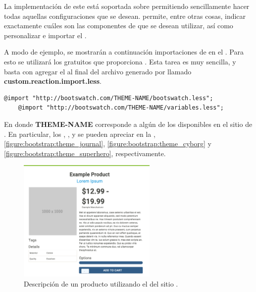 La implementación de este \packagesAS está soportada sobre \bootstrapPackage permitiendo sencillamente hacer todas aquellas configuraciones que se desean. \bootstrapPackage permite, entre otras cosas, indicar exactamente cuáles son las componentes de \bootstrapNAME que se desean utilizar, así como personalizar e importar el \themeCPT.

A modo de ejemplo, se mostrarán a continuación importaciones de \themesCPT en el \frameworkPC. Para esto se utilizará los \themesCPT gratuitos que proporciona \bootswatchNAME. Esta tarea es muy sencilla, y basta con agregar el  al final del archivo generado por \bootstrapPackage llamado \textbf{custom.reaction.import.less}.

%
\medskip
\begin{lstlisting}[caption= Código genérico para importar \themesCPT desde \bootswatchNAME., label=source:less:generic_bootswatch_theme]
	@import "http://bootswatch.com/THEME-NAME/bootswatch.less";
	@import "http://bootswatch.com/THEME-NAME/variables.less";
\end{lstlisting}

En donde \textbf{THEME-NAME} corresponde a algún \themeCPT de los disponibles en el sitio de \bootswatchNAME. En particular, los \themesCPT \textbf{\themeSandstone}, \textbf{\themeJournal}, \textbf{\themeCyborg} y \textbf{\themeSuperHero} se pueden apreciar en la , \ref{figure:bootstrap:theme_journal}, \ref{figure:bootstrap:theme_cyborg} y \ref{figure:bootstrap:theme_superhero}, respectivamente.


\begin{figure}[H]
	\centering
	\includegraphics[width=0.6\textwidth]{figuras/bootstrap/bootstrap_theme_sandstone.png}

	\caption{Descripción de un producto utilizando el \themeCPT \textbf{\themeSandstone} del sitio \bootswatchNAME.}
	\label{figure:bootstrap:theme_standstone}
\end{figure}

